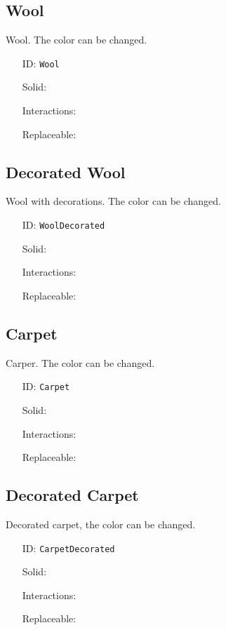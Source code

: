 \subsection{Wool}\label{subsec:blocks_wool}
Wool. The color can be changed.
\newline
\begin{itemize}[nosep]
    \item[ID:] \texttt{Wool}
    \item[Solid:]  \Checkmark \item[Interactions:]  \Checkmark \item[Replaceable:]  \XSolidBrush
\end{itemize}

\subsection{Decorated Wool}\label{subsec:blocks_decorated wool}
Wool with decorations. The color can be changed.
\newline
\begin{itemize}[nosep]
    \item[ID:] \texttt{WoolDecorated}
    \item[Solid:]  \Checkmark \item[Interactions:]  \Checkmark \item[Replaceable:]  \XSolidBrush
\end{itemize}

\subsection{Carpet}\label{subsec:blocks_carpet}
Carper. The color can be changed.
\newline
\begin{itemize}[nosep]
    \item[ID:] \texttt{Carpet}
    \item[Solid:]  \Checkmark \item[Interactions:]  \Checkmark \item[Replaceable:]  \XSolidBrush
\end{itemize}

\subsection{Decorated Carpet}\label{subsec:blocks_decorated carpet}
Decorated carpet, the color can be changed.
\newline
\begin{itemize}[nosep]
    \item[ID:] \texttt{CarpetDecorated}
    \item[Solid:]  \Checkmark \item[Interactions:]  \Checkmark \item[Replaceable:]  \XSolidBrush
\end{itemize}

